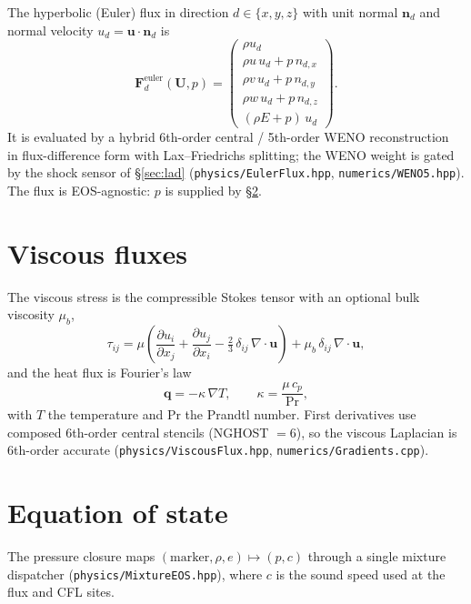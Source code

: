 \documentclass[11pt]{article}
\newcommand{\dpar}[2]{\frac{\partial #1}{\partial #2}}
\newcommand{\uvec}{\mathbf{u}}
\newcommand{\code}[1]{\texttt{#1}}
\begin{document}
The hyperbolic (Euler) flux in direction $d\in\{x,y,z\}$ with unit normal
$\mathbf{n}_d$ and normal velocity $u_d=\uvec\cdot\mathbf{n}_d$ is
\begin{equation}
\mathbf{F}^{\text{euler}}_d(\mathbf{U},p) =
\begin{pmatrix}
\rho u_d \\
\rho u\, u_d + p\,n_{d,x} \\
\rho v\, u_d + p\,n_{d,y} \\
\rho w\, u_d + p\,n_{d,z} \\
(\rho E + p)\,u_d
\end{pmatrix}.
\end{equation}
It is evaluated by a hybrid 6th-order central / 5th-order WENO reconstruction~\cite{jiang_shu_1996,pirozzoli_2002} in
flux-difference form with Lax--Friedrichs splitting; the WENO weight is gated by
the shock sensor of \S\ref{sec:lad} (\code{physics/EulerFlux.hpp},
\code{numerics/WENO5.hpp}). The flux is EOS-agnostic: $p$ is supplied by
\S\ref{sec:eos}.

\section{Viscous fluxes}
\label{sec:viscous}

The viscous stress is the compressible Stokes tensor with an optional bulk
viscosity $\mu_b$,
\begin{equation}
\tau_{ij} = \mu\!\left(\dpar{u_i}{x_j} + \dpar{u_j}{x_i}
            - \tfrac23\,\delta_{ij}\,\nabla\!\cdot\uvec\right)
          + \mu_b\,\delta_{ij}\,\nabla\!\cdot\uvec,
\end{equation}
and the heat flux is Fourier's law
\begin{equation}
\mathbf{q} = -\kappa\,\nabla T,
\qquad \kappa = \frac{\mu\,c_p}{\mathrm{Pr}},
\end{equation}
with $T$ the temperature and $\mathrm{Pr}$ the Prandtl number. First derivatives
use composed 6th-order central stencils (NGHOST $=6$), so the viscous Laplacian
is 6th-order accurate (\code{physics/ViscousFlux.hpp},
\code{numerics/Gradients.cpp}).

\section{Equation of state}
\label{sec:eos}

The pressure closure maps $(\text{marker},\rho,e) \mapsto (p,c)$ through a single
mixture dispatcher (\code{physics/MixtureEOS.hpp}), where $c$ is the sound speed
used at the flux and CFL sites.
\end{document}
